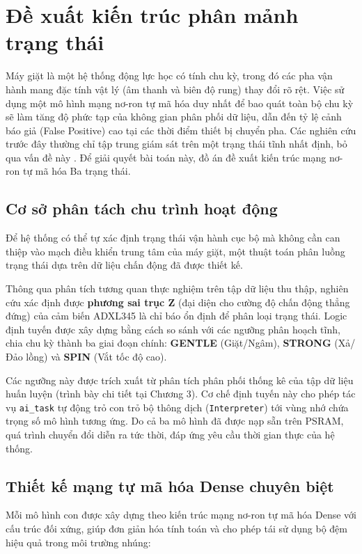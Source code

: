 
\section{Đề xuất kiến trúc phân mảnh trạng thái}

Máy giặt là một hệ thống động lực học có tính chu kỳ, trong đó các pha vận hành mang đặc tính vật lý (âm thanh và biên độ rung) thay đổi rõ rệt. Việc sử dụng một mô hình mạng nơ-ron tự mã hóa duy nhất để bao quát toàn bộ chu kỳ sẽ làm tăng độ phức tạp của không gian phân phối dữ liệu, dẫn đến tỷ lệ cảnh báo giả (False Positive) cao tại các thời điểm thiết bị chuyển pha. Các nghiên cứu trước đây thường chỉ tập trung giám sát trên một trạng thái tĩnh nhất định, bỏ qua vấn đề này \cite{ref_1_lord}. Để giải quyết bài toán này, đồ án đề xuất kiến trúc mạng nơ-ron tự mã hóa Ba trạng thái.

\subsection{Cơ sở phân tách chu trình hoạt động}

Để hệ thống có thể tự xác định trạng thái vận hành cục bộ mà không cần can thiệp vào mạch điều khiển trung tâm của máy giặt, một thuật toán phân luồng trạng thái dựa trên dữ liệu chấn động đã được thiết kế.

Thông qua phân tích tương quan thực nghiệm trên tập dữ liệu thu thập, nghiên cứu xác định được \textbf{phương sai trục Z} (đại diện cho cường độ chấn động thẳng đứng) của cảm biến ADXL345 là chỉ báo ổn định để phân loại trạng thái. Logic định tuyến được xây dựng bằng cách so sánh với các ngưỡng phân hoạch tĩnh, chia chu kỳ thành ba giai đoạn chính: \textbf{GENTLE} (Giặt/Ngâm), \textbf{STRONG} (Xả/Đảo lồng) và \textbf{SPIN} (Vắt tốc độ cao).

Các ngưỡng này được trích xuất từ phân tích phân phối thống kê của tập dữ liệu huấn luyện (trình bày chi tiết tại Chương 3). Cơ chế định tuyến này cho phép tác vụ \texttt{ai\_task} tự động trỏ con trỏ bộ thông dịch (\texttt{Interpreter}) tới vùng nhớ chứa trọng số mô hình tương ứng. Do cả ba mô hình đã được nạp sẵn trên PSRAM, quá trình chuyển đổi diễn ra tức thời, đáp ứng yêu cầu thời gian thực của hệ thống.

\subsection{Thiết kế mạng tự mã hóa Dense chuyên biệt}

Mỗi mô hình con được xây dựng theo kiến trúc mạng nơ-ron tự mã hóa Dense với cấu trúc đối xứng, giúp đơn giản hóa tính toán và cho phép tái sử dụng bộ đệm hiệu quả trong môi trường nhúng:


